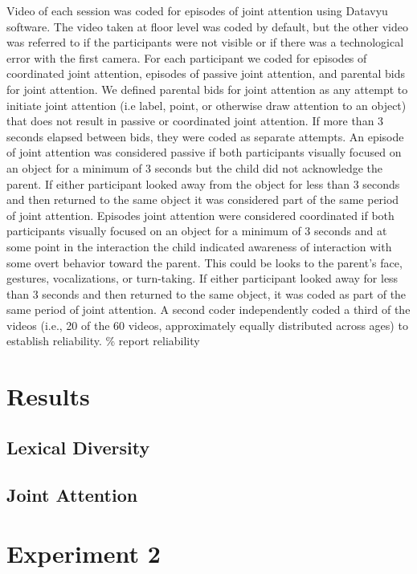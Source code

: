 \documentclass[10pt, letterpaper]{article}
\begin{document}
Video of each session was coded for episodes of joint attention using
Datavyu software. The video taken at floor level was coded by default,
but the other video was referred to if the participants were not visible
or if there was a technological error with the first camera. For each
participant we coded for episodes of coordinated joint attention,
episodes of passive joint attention, and parental bids for joint
attention. We defined parental bids for joint attention as any attempt
to initiate joint attention (i.e label, point, or otherwise draw
attention to an object) that does not result in passive or coordinated
joint attention. If more than 3 seconds elapsed between bids, they were
coded as separate attempts. An episode of joint attention was considered
passive if both participants visually focused on an object for a minimum
of 3 seconds but the child did not acknowledge the parent. If either
participant looked away from the object for less than 3 seconds and then
returned to the same object it was considered part of the same period of
joint attention. Episodes joint attention were considered coordinated if
both participants visually focused on an object for a minimum of 3
seconds and at some point in the interaction the child indicated
awareness of interaction with some overt behavior toward the parent.
This could be looks to the parent's face, gestures, vocalizations, or
turn-taking. If either participant looked away for less than 3 seconds
and then returned to the same object, it was coded as part of the same
period of joint attention. A second coder independently coded a third of
the videos (i.e., 20 of the 60 videos, approximately equally distributed
across ages) to establish reliability. \% report reliability

\section{Results}\label{results}

\subsection{Lexical Diversity}\label{lexical-diversity}

\subsection{Joint Attention}\label{joint-attention}

\section{Experiment 2}\label{experiment-2}
\end{document}
